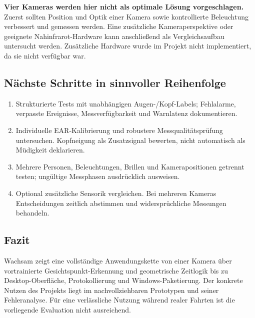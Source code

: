 \documentclass[11pt,a4paper]{article}
\begin{document}
\textbf{Vier Kameras werden hier nicht als optimale Lösung vorgeschlagen.} Zuerst sollten Position und Optik einer Kamera sowie kontrollierte Beleuchtung verbessert und gemessen werden. Eine zusätzliche Kameraperspektive oder geeignete Nahinfrarot-Hardware kann anschließend als Vergleichsaufbau untersucht werden. Zusätzliche Hardware wurde im Projekt nicht implementiert, da sie nicht verfügbar war.
\subsection*{Nächste Schritte in sinnvoller Reihenfolge}
\begin{enumerate}
\item Strukturierte Tests mit unabhängigen Augen-/Kopf-Labels; Fehlalarme, verpasste Ereignisse, Messverfügbarkeit und Warnlatenz dokumentieren.
\item Individuelle EAR-Kalibrierung und robustere Messqualitätsprüfung untersuchen. Kopfneigung als Zusatzsignal bewerten, nicht automatisch als Müdigkeit deklarieren.
\item Mehrere Personen, Beleuchtungen, Brillen und Kamerapositionen getrennt testen; ungültige Messphasen ausdrücklich ausweisen.
\item Optional zusätzliche Sensorik vergleichen. Bei mehreren Kameras Entscheidungen zeitlich abstimmen und widersprüchliche Messungen behandeln.
\end{enumerate}
\subsection*{Fazit}
Wachsam zeigt eine vollständige Anwendungskette von einer Kamera über vortrainierte Gesichtspunkt-Erkennung und geometrische Zeitlogik bis zu Desktop-Oberfläche, Protokollierung und Windows-Paketierung. Der konkrete Nutzen des Projekts liegt im nachvollziehbaren Prototypen und seiner Fehleranalyse. Für eine verlässliche Nutzung während realer Fahrten ist die vorliegende Evaluation nicht ausreichend.
\newpage
\end{document}

